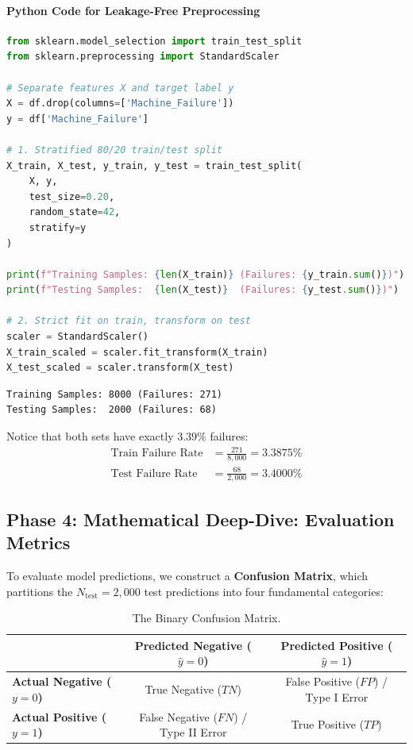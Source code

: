 \paragraph{Python Code for Leakage-Free Preprocessing}
\begin{lstlisting}[language=Python]
from sklearn.model_selection import train_test_split
from sklearn.preprocessing import StandardScaler

# Separate features X and target label y
X = df.drop(columns=['Machine_Failure'])
y = df['Machine_Failure']

# 1. Stratified 80/20 train/test split
X_train, X_test, y_train, y_test = train_test_split(
    X, y, 
    test_size=0.20, 
    random_state=42, 
    stratify=y
)

print(f"Training Samples: {len(X_train)} (Failures: {y_train.sum()})")
print(f"Testing Samples:  {len(X_test)}  (Failures: {y_test.sum()})")

# 2. Strict fit on train, transform on test
scaler = StandardScaler()
X_train_scaled = scaler.fit_transform(X_train)
X_test_scaled = scaler.transform(X_test)
\end{lstlisting}

\begin{lstlisting}[style=outputstyle]
Training Samples: 8000 (Failures: 271)
Testing Samples:  2000 (Failures: 68)
\end{lstlisting}

Notice that both sets have exactly $3.39\%$ failures:
\begin{align*}
\text{Train Failure Rate} &= \frac{271}{8{,}000} = 3.3875\% \\
\text{Test Failure Rate} &= \frac{68}{2{,}000} = 3.4000\%
\end{align*}

\subsection{Phase 4: Mathematical Deep-Dive: Evaluation Metrics}

To evaluate model predictions, we construct a \textbf{Confusion Matrix}, which partitions the $N_{\text{test}} = 2{,}000$ test predictions into four fundamental categories:

\begin{table}[htbp]
\centering
\begin{tabular}{lcc}
\toprule
& \textbf{Predicted Negative ($\hat{y}=0$)} & \textbf{Predicted Positive ($\hat{y}=1$)} \\
\midrule
\textbf{Actual Negative ($y=0$)} & True Negative ($TN$) & False Positive ($FP$) / Type I Error \\
\textbf{Actual Positive ($y=1$)} & False Negative ($FN$) / Type II Error & True Positive ($TP$) \\
\bottomrule
\end{tabular}
\caption{The Binary Confusion Matrix.}\label{tab:confusion_matrix}
\end{table}

